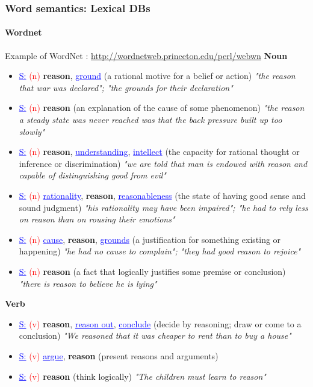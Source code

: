 \documentclass[xcolor=table]{beamer}
\begin{document}
\begin{frame}
\frametitle{Word semantics: Lexical DBs}
\framesubtitle{Wordnet}

\begin{exampleblock}{Example of WordNet : \small\url{http://wordnetweb.princeton.edu/perl/webwn}}
	\fontsize{6}{6}\selectfont
	{\small\bfseries Noun}
	\begin{itemize}\setlength\itemsep{0pt}
		\item \textcolor{blue}{\underline{S:}} \textcolor{red}{(n)} \textbf{reason}, \textcolor{blue}{\underline{ground}} (a rational motive for a belief or action) \textit{"the reason that war was declared"; "the grounds for their declaration"}
		\item \textcolor{blue}{\underline{S:}} \textcolor{red}{(n)} \textbf{reason} (an explanation of the cause of some phenomenon) \textit{"the reason a steady state was never reached was that the back pressure built up too slowly"}
		\item \textcolor{blue}{\underline{S:}} \textcolor{red}{(n)} \textbf{reason}, \textcolor{blue}{\underline{understanding}}, \textcolor{blue}{\underline{intellect}} (the capacity for rational thought or inference or discrimination) \textit{"we are told that man is endowed with reason and capable of distinguishing good from evil"}
		\item \textcolor{blue}{\underline{S:}} \textcolor{red}{(n)} \textcolor{blue}{\underline{rationality}}, \textbf{reason}, \textcolor{blue}{\underline{reasonableness}} (the state of having good sense and sound judgment) \textit{"his rationality may have been impaired"; "he had to rely less on reason than on rousing their emotions"}
		\item \textcolor{blue}{\underline{S:}} \textcolor{red}{(n)} \textcolor{blue}{\underline{cause}}, \textbf{reason}, \textcolor{blue}{\underline{grounds}} (a justification for something existing or happening) \textit{"he had no cause to complain"; "they had good reason to rejoice"}
		\item \textcolor{blue}{\underline{S:}} \textcolor{red}{(n)} \textbf{reason} (a fact that logically justifies some premise or conclusion) \textit{"there is reason to believe he is lying"}
	\end{itemize}
	
	{\small\bfseries Verb}
	\begin{itemize}\setlength\itemsep{0pt}
		\item \textcolor{blue}{\underline{S:}} \textcolor{red}{(v)} \textbf{reason}, \textcolor{blue}{\underline{reason out}}, \textcolor{blue}{\underline{conclude}} (decide by reasoning; draw or come to a conclusion) \textit{"We reasoned that it was cheaper to rent than to buy a house"}
		\item \textcolor{blue}{\underline{S:}} \textcolor{red}{(v)} \textcolor{blue}{\underline{argue}}, \textbf{reason} (present reasons and arguments)
		\item \textcolor{blue}{\underline{S:}} \textcolor{red}{(v)} \textbf{reason} (think logically) \textit{"The children must learn to reason"}
	\end{itemize}
\end{exampleblock}
	

\end{frame}
\end{document}
